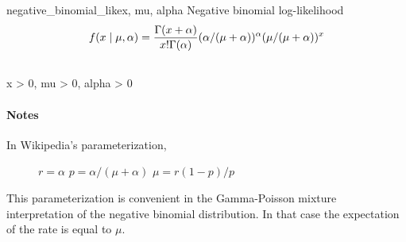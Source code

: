 \hypertarget{pymc.distributions.negative_binomial_like}{}\begin{funcdesc}{negative\_binomial\_like}{x, mu, alpha}
Negative binomial log-likelihood
\begin{gather}
\begin{split}f(x \mid \mu, \alpha) = \frac{\Gamma(x+\alpha)}{x! \Gamma(\alpha)} (\alpha/(\mu+\alpha))^\alpha (\mu/(\mu+\alpha))^x\end{split}\notag\\\begin{split}\end{split}\notag
\end{gather}
x \textgreater{} 0, mu \textgreater{} 0, alpha \textgreater{} 0
\paragraph{Notes}
\begin{description}
\item[In Wikipedia's parameterization,]
$r=\alpha$
$p=\alpha/(\mu+\alpha)$
$\mu=r(1-p)/p$

\end{description}

This parameterization is convenient in the Gamma-Poisson mixture interpretation
of the negative binomial distribution. In that case the expectation of the rate
is equal to $\mu$.
\end{funcdesc}

